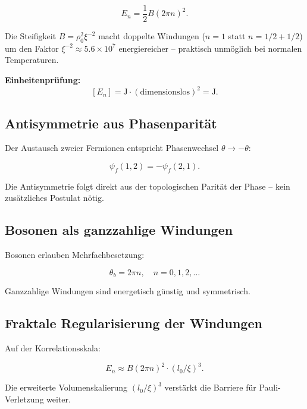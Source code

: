 	\begin{equation}
		E_n = \frac{1}{2} B (2\pi n)^2.
	\end{equation}
	
	Die Steifigkeit \(B = \rho_0^2 \xi^{-2}\) macht doppelte Windungen (\(n=1\) statt \(n=1/2 + 1/2\)) um den Faktor \(\xi^{-2} \approx 5.6 \times 10^7\) energiereicher – praktisch unmöglich bei normalen Temperaturen.
	
	\textbf{Einheitenprüfung:}
	\[
	[E_n] = \si{\joule} \cdot (\text{dimensionslos})^2 = \si{\joule}.
	\]
	
	\subsection*{Antisymmetrie aus Phasenparität}
	
	Der Austausch zweier Fermionen entspricht Phasenwechsel \(\theta \to -\theta\):
	
	\begin{equation}
		\psi_f(1,2) = -\psi_f(2,1).
	\end{equation}
	
	Die Antisymmetrie folgt direkt aus der topologischen Parität der Phase – kein zusätzliches Postulat nötig.
	
	\subsection*{Bosonen als ganzzahlige Windungen}
	
	Bosonen erlauben Mehrfachbesetzung:
	
	\begin{equation}
		\theta_b = 2\pi n, \quad n = 0, 1, 2, \ldots
	\end{equation}
	
	Ganzzahlige Windungen sind energetisch günstig und symmetrisch.
	
	\subsection*{Fraktale Regularisierung der Windungen}
	
	Auf der Korrelationsskala:
	
	\begin{equation}
		E_n \approx B (2\pi n)^2 \cdot (l_0 / \xi)^3.
	\end{equation}
	
	Die erweiterte Volumenskalierung \( (l_0 / \xi)^3 \) verstärkt die Barriere für Pauli-Verletzung weiter.
	
